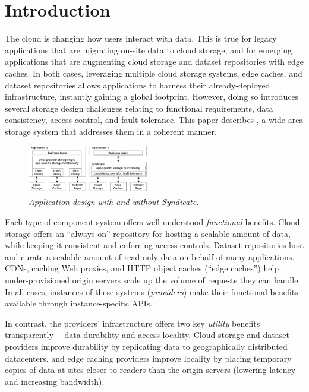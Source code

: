 \section{Introduction}

The cloud is changing how users interact with data. This is true for
legacy applications that are migrating on-site data to cloud
storage, and for emerging applications that are augmenting
cloud storage and dataset repositories with edge caches. In both cases,
leveraging multiple cloud storage systems, edge caches, and dataset
repositories allows applications to harness their already-deployed infrastructure,
instantly gaining a global footprint.  However, doing so introduces
several storage design challenges relating to functional requirements,
data consistency, access control, and fault tolerance. This paper
describes \Syndicate, a wide-area storage system that addresses them 
in a coherent manner.

\begin{figure}[h!]
\centering
\includegraphics[width=0.47\textwidth]{figures/overview}
\caption{\it Application design with and without Syndicate.}
\label{fig:overview}
\end{figure}

Each type of component system offers well-understood
{\it functional} benefits.  Cloud storage offers an ``always-on''
repository for hosting a scalable amount of data, while keeping it
consistent and enforcing access controls.
Dataset repositories host and curate a scalable amount of read-only data on 
behalf of many applications.  CDNs, caching Web proxies, and HTTP object caches (``edge
caches'') help under-provisioned origin servers scale up the
volume of requests they can handle.
In all cases, instances of these systems ({\it providers}) make their 
functional benefits available through instance-specific APIs.

In contrast, the providers' infrastructure
offers two key \textit{utility} benefits transparently
---data durability and access locality.
Cloud storage and dataset providers improve durability by
replicating data to geographically distributed
datacenters, and edge caching providers improve locality by
placing temporary copies of data at sites closer to readers than the
origin servers (lowering latency and increasing bandwidth).

